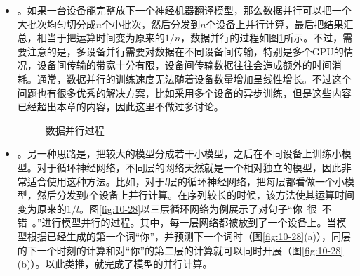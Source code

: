 \begin{itemize}
\vspace{0.5em}

\item {\small{}}。如果一台设备能完整放下一个神经机器翻译模型，那么数据并行可以把一个大批次均匀切分成$n$个小批次，然后分发到$n$个设备上并行计算，最后把结果汇总，相当于把运算时间变为原来的${1}/{n}$，数据并行的过程如图\ref{fig:10-27}所示。不过，需要注意的是，多设备并行需要对数据在不同设备间传输，特别是多个GPU的情况，设备间传输的带宽十分有限，设备间传输数据往往会造成额外的时间消耗。通常，数据并行的训练速度无法随着设备数量增加呈线性增长。不过这个问题也有很多优秀的解决方案，比如采用多个设备的异步训练，但是这些内容已经超出本章的内容，因此这里不做过多讨论。

\begin{figure}[htp]
\centering

\caption{数据并行过程}
\label{fig:10-27}
\end{figure}

\vspace{0.5em}
\item {\small{}}。另一种思路是，把较大的模型分成若干小模型，之后在不同设备上训练小模型。对于循环神经网络，不同层的网络天然就是一个相对独立的模型，因此非常适合使用这种方法。比如，对于$l$层的循环神经网络，把每层都看做一个小模型，然后分发到$l$个设备上并行计算。在序列较长的时候，该方法使其运算时间变为原来的${1}/{l}$。图\ref{fig:10-28}以三层循环网络为例展示了对句子“你\ 很\ 不错\ 。”进行模型并行的过程。其中，每一层网络都被放到了一个设备上。当模型根据已经生成的第一个词“你”，并预测下一个词时（图\ref{fig:10-28}(a)），同层的下一个时刻的计算和对“你”的第二层的计算就可以同时开展（图\ref{fig:10-28}(b)）。以此类推，就完成了模型的并行计算。
\vspace{0.5em}
\end{itemize}

